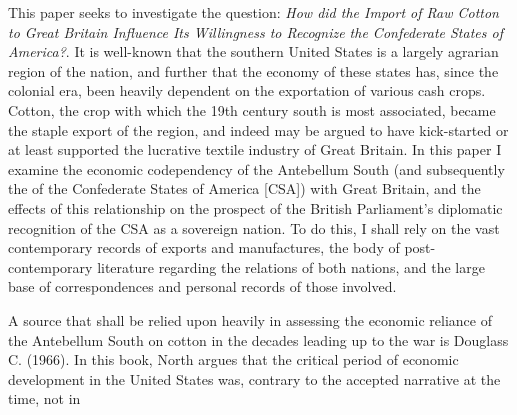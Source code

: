 
This paper seeks to investigate the question: \flq{} \textit{How did the Import of Raw Cotton to Great Britain Influence Its Willingness to Recognize the
Confederate States of America?}\frq{}. It is well-known that the southern United States is a largely agrarian region of the nation, and further that the 
economy of these states has, since the colonial era, been heavily dependent on the exportation of various \flq{}cash crops\frq{}. Cotton, the crop with which 
the 19th century south is most associated, became the staple export of the region, and indeed may be argued to have kick-started or at least supported the 
lucrative textile industry of Great Britain. In this paper I examine the economic codependency of the Antebellum South (and subsequently the of the 
Confederate States of America [CSA]) with Great Britain, and the effects of this relationship on the prospect of the British Parliament's diplomatic 
recognition of the CSA as a sovereign nation. To do this, I shall rely on the vast contemporary records of exports and manufactures, the body of post-
contemporary literature regarding the relations of both nations, and the large base of correspondences and personal records of those involved.

A source that shall be relied upon heavily in assessing the economic reliance of the Antebellum South on cotton in the decades leading up to the war is 
Douglass C.  (1966). In this book, North argues that the critical period of economic development in the United States
was, contrary to the accepted narrative at the time, not in
